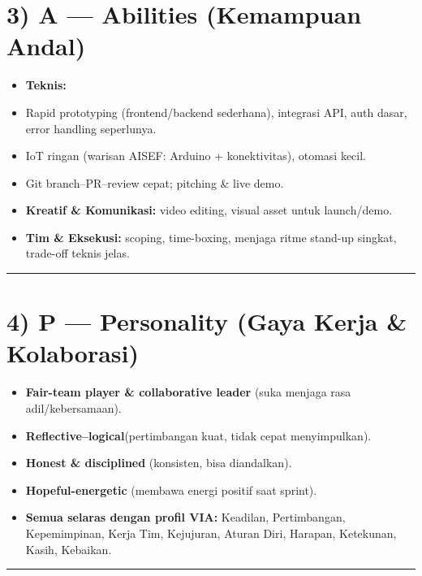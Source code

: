 \documentclass[
  letterpaper,
  DIV=11,
  numbers=noendperiod]{scrreprt}
\begin{document}
\section{3) A --- Abilities (Kemampuan
Andal)}\label{a-abilities-kemampuan-andal}

\begin{itemize}
\item
  \textbf{Teknis:}
\item
  Rapid prototyping (frontend/backend sederhana), integrasi API, auth
  dasar, error handling seperlunya.
\item
  IoT ringan (warisan AISEF: Arduino + konektivitas), otomasi kecil.
\item
  Git branch--PR--review cepat; pitching \& live demo.
\item
  \textbf{Kreatif \& Komunikasi:} video editing, visual asset untuk
  launch/demo.
\item
  \textbf{Tim \& Eksekusi:} scoping, time-boxing, menjaga ritme stand-up
  singkat, trade-off teknis jelas.
\end{itemize}

\begin{center}\rule{0.5\linewidth}{0.5pt}\end{center}

\section{4) P --- Personality (Gaya Kerja \&
Kolaborasi)}\label{p-personality-gaya-kerja-kolaborasi}

\begin{itemize}
\item
  \textbf{Fair-team player \& collaborative leader} (suka menjaga rasa
  adil/kebersamaan).
\item
  \textbf{Reflective--logical}(pertimbangan kuat, tidak cepat
  menyimpulkan).
\item
  \textbf{Honest \& disciplined} (konsisten, bisa diandalkan).
\item
  \textbf{Hopeful-energetic} (membawa energi positif saat sprint).
\item
  \textbf{Semua selaras dengan profil VIA:} Keadilan, Pertimbangan,
  Kepemimpinan, Kerja Tim, Kejujuran, Aturan Diri, Harapan, Ketekunan,
  Kasih, Kebaikan.
\end{itemize}

\begin{center}\rule{0.5\linewidth}{0.5pt}\end{center}
\end{document}

